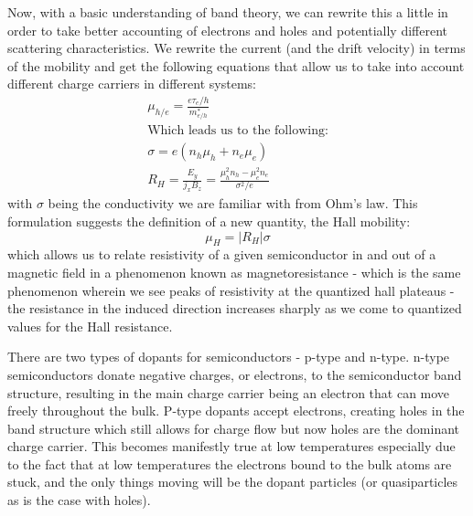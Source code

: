 \documentclass[reprint, nobibnotes, amssymb, amsmath, amsfonts, physics, mathtools, mathrsfs, floatfix]{revtex4-1}
\begin{document}
    Now, with a basic understanding of band theory, we can rewrite this a little in order to take better accounting of electrons and holes and potentially different scattering characteristics.  We rewrite the current (and the drift velocity) in terms of the mobility and get the following equations that allow us to take into account different charge carriers in different systems:
    \begin{gather}
      \mu_{h/e} = \frac{e \tau_e/h}{m_{e/h}^*} \label{mobility} \\
      \text{Which leads us to the following:} \nonumber \\
      \sigma = e(n_h\mu_h + n_e\mu_e) \label{conductivity} \\
      R_H = \frac{E_y}{j_x B_z} = \frac{\mu_h^2 n_h - \mu_e^2 n_e}{\sigma^2/e}
    \end{gather}
    with $\sigma$ being the conductivity we are familiar with from Ohm's law.  This formulation suggests the definition of a new quantity, the Hall mobility:
    \begin{equation}
      \mu_H = |R_H|\sigma \label{hall_mobility}
    \end{equation}
    which allows us to relate resistivity of a given semiconductor in and out of a magnetic field in a phenomenon known as magnetoresistance - which is the same phenomenon wherein we see peaks of resistivity at the quantized hall plateaus - the resistance in the induced direction increases sharply as we come to quantized values for the Hall resistance.

    There are two types of dopants for semiconductors - p-type and n-type.  n-type semiconductors donate negative charges, or electrons, to the semiconductor band structure, resulting in the main charge carrier being an electron that can move freely throughout the bulk.  P-type dopants accept electrons, creating holes in the band structure which still allows for charge flow but now holes are the dominant charge carrier.  This becomes manifestly true at low temperatures especially due to the fact that at low temperatures the electrons bound to the bulk atoms are stuck, and the only things moving will be the dopant particles (or quasiparticles as is the case with holes).
\end{document}
